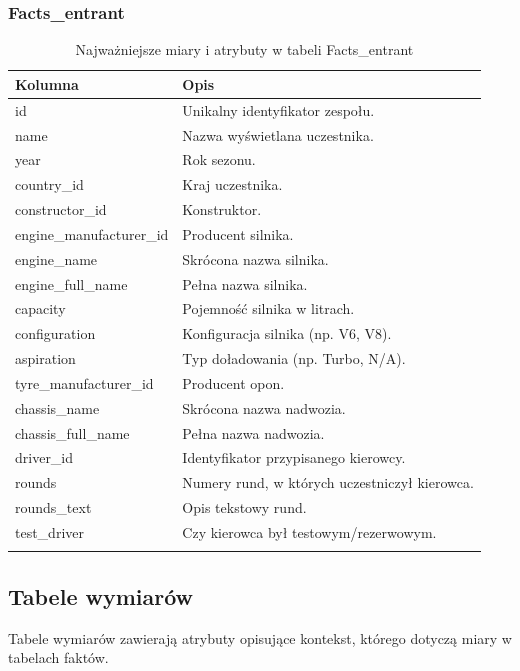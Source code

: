 \documentclass[12pt]{article}
\begin{document}
\subsubsection{Facts\_entrant}
\begin{longtable}{lp{8.5cm}}
\toprule
\textbf{Kolumna} & \textbf{Opis} \\
\midrule
\endhead

id & Unikalny identyfikator zespołu. \\
name & Nazwa wyświetlana uczestnika. \\
year & Rok sezonu. \\
country\_id & Kraj uczestnika. \\
constructor\_id & Konstruktor. \\
engine\_manufacturer\_id & Producent silnika. \\
engine\_name & Skrócona nazwa silnika. \\
engine\_full\_name & Pełna nazwa silnika. \\
capacity & Pojemność silnika w litrach. \\
configuration & Konfiguracja silnika (np. V6, V8). \\
aspiration & Typ doładowania (np. Turbo, N/A). \\
tyre\_manufacturer\_id & Producent opon. \\
chassis\_name & Skrócona nazwa nadwozia. \\
chassis\_full\_name & Pełna nazwa nadwozia. \\
driver\_id & Identyfikator przypisanego kierowcy. \\
rounds & Numery rund, w których uczestniczył kierowca. \\
rounds\_text & Opis tekstowy rund. \\
test\_driver & Czy kierowca był testowym/rezerwowym. \\

\bottomrule
\caption{Najważniejsze miary i atrybuty w tabeli Facts\_entrant}
\end{longtable}

\subsection{Tabele wymiarów}
Tabele wymiarów zawierają atrybuty opisujące kontekst, którego dotyczą miary w tabelach faktów.
\end{document}
